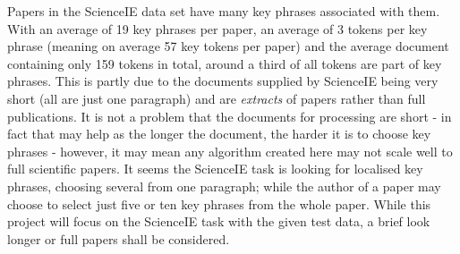 Papers in the ScienceIE data set have many key phrases associated with them. With an average of 19 key phrases per paper, an average of 3 tokens per key phrase (meaning on average 57 key tokens per paper) and the average document containing only 159 tokens in total, around a third of all tokens are part of key phrases. This is partly due to the documents supplied by ScienceIE being very short (all are just one paragraph) and are \textit{extracts} of papers rather than full publications. It is not a problem that the documents for processing are short - in fact that may help as the longer the document, the harder it is to choose key phrases \cite{Hasan2014} - however, it may mean any algorithm created here may not scale well to full scientific papers. It seems the ScienceIE task is looking for localised key phrases, choosing several from one paragraph; while the author of a paper may choose to select just five or ten key phrases from the whole paper. While this project will focus on the ScienceIE task with the given test data, a brief look longer or full papers shall be considered.
